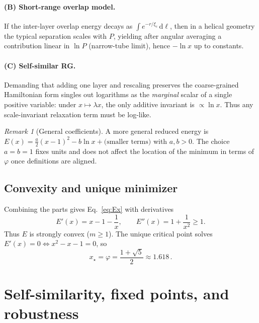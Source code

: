 \documentclass[11pt]{article}
\theoremstyle{remark}
\newtheorem{remark}{Remark}
\theoremstyle{definition}
\newcommand{\ph}{\varphi}
\begin{document}
\paragraph{(B) Short-range overlap model.} If the inter-layer overlap energy decays as $\int e^{-r/\xi_c}\,\mathrm d\ell$, then in a helical geometry the typical separation scales with $P$, yielding after angular averaging a contribution linear in $\ln P$ (narrow-tube limit), hence $-\ln x$ up to constants.

\paragraph{(C) Self-similar RG.} Demanding that adding one layer and rescaling preserves the coarse-grained Hamiltonian form singles out logarithms as the \emph{marginal} scalar of a single positive variable: under $x\mapsto \lambda x$, the only additive invariant is $\propto \ln x$. Thus any scale-invariant relaxation term must be log-like.

\begin{remark}[General coefficients]
A more general reduced energy is $E(x)=\tfrac{a}{2}(x-1)^2-b\ln x+\text{(smaller terms)}$ with $a,b>0$. The choice $a=b=1$ fixes units and does not affect the location of the minimum in terms of $\ph$ once definitions are aligned.
\end{remark}

\subsection{Convexity and unique minimizer}
Combining the parts gives Eq.~\eqref{eq:Ex} with derivatives
\begin{equation}
 E'(x)=x-1-\frac{1}{x},\qquad E''(x)=1+\frac{1}{x^2}\ge1.
\end{equation}
Thus $E$ is strongly convex ($m\ge1$). The unique critical point solves $E'(x)=0\iff x^2-x-1=0$, so
\begin{equation}
 x_\star=\ph=\frac{1+\sqrt5}{2} \approx 1.618\,.
\end{equation}

\section{Self-similarity, fixed points, and robustness}
\end{document}
